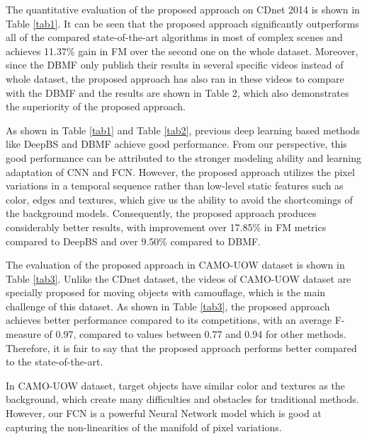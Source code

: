 \documentclass[journal]{IEEEtran}
\newcommand{\reftab}[1]{Table \ref{#1}}
\begin{document}
The quantitative evaluation of the proposed approach on CDnet 2014 is shown in \reftab{tab1}. 
It can be seen that the proposed approach significantly outperforms all of the compared state-of-the-art algorithms in most of complex scenes and achieves 11.37\% gain in FM over the second one on the whole dataset. 
%
Moreover,
since the DBMF only publish their results in several specific videos instead of whole dataset,
the proposed approach has also ran in these videos to compare with the DBMF and the results are shown in Table 2,
which also demonstrates the superiority of the proposed approach.

As shown in \reftab{tab1} and \reftab{tab2}, previous deep learning based methods like DeepBS and DBMF achieve good performance. 
From our perspective, this good performance can be attributed to the stronger modeling ability and learning adaptation of CNN and FCN. 
However, the proposed approach utilizes the pixel variations in a temporal sequence rather than low-level static features such as color, edges and textures, which give us the ability to avoid the shortcomings of the background models. 
Consequently, the proposed approach produces considerably better results, with improvement over 17.85\% in FM metrics compared to DeepBS and over 9.50\% compared to DBMF.

The evaluation of the proposed approach in CAMO-UOW dataset is shown in \reftab{tab3}. 
Unlike the CDnet dataset, the videos of CAMO-UOW dataset are specially proposed for moving objects with camouflage, which is the main challenge of this dataset. 
As shown in \reftab{tab3}, the proposed approach achieves better performance compared to its competitions, 
with an average F-measure of 0.97, compared to values between 0.77 and 0.94 for other methods. 
Therefore, it is fair to say that the proposed approach performs better compared to the state-of-the-art.


In CAMO-UOW dataset, target objects have similar color and textures as the background, which create many difficulties and obstacles for traditional methods. 
However, our FCN is a powerful Neural Network model which is good at capturing the non-linearities of the manifold of pixel variations. 
\end{document}
